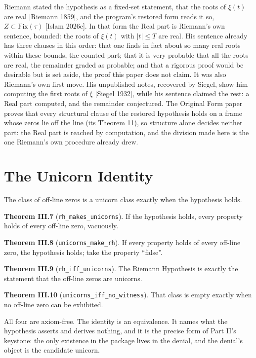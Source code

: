 \documentclass[10pt]{article}
\begin{document}
Riemann stated the hypothesis as a fixed-set statement, that the roots
of \(\xi(t)\) are real {[}Riemann 1859{]}, and the program's restored
form reads it so, \(Z \subset \mathrm{Fix}(\tau)\) {[}Islam 2026e{]}. In
that form the Real part is Riemann's own sentence, bounded: the roots of
\(\xi(t)\) with \(|t| \leq T\) are real. His sentence already has three
clauses in this order: that one finds in fact about so many real roots
within these bounds, the counted part; that it is very probable that all
the roots are real, the remainder graded as probable; and that a
rigorous proof would be desirable but is set aside, the proof this paper
does not claim. It was also Riemann's own first move. His unpublished
notes, recovered by Siegel, show him computing the first roots of
\(\xi\) {[}Siegel 1932{]}, while his sentence claimed the rest: a Real
part computed, and the remainder conjectured. The Original Form paper
proves that every structural clause of the restored hypothesis holds on
a frame whose zeros lie off the line (its Theorem 11), so structure
alone decides neither part: the Real part is reached by computation, and
the division made here is the one Riemann's own procedure already drew.

\hypertarget{the-unicorn-identity}{%
\section{The Unicorn Identity}\label{the-unicorn-identity}}

The class of off-line zeros is a unicorn class exactly when the
hypothesis holds.

\textbf{Theorem III.7} (\texttt{rh\_makes\_unicorns}). If the hypothesis
holds, every property holds of every off-line zero, vacuously.

\textbf{Theorem III.8} (\texttt{unicorns\_make\_rh}). If every property
holds of every off-line zero, the hypothesis holds; take the property
``false''.

\textbf{Theorem III.9} (\texttt{rh\_iff\_unicorns}). The Riemann
Hypothesis is exactly the statement that the off-line zeros are
unicorns.

\textbf{Theorem III.10} (\texttt{unicorns\_iff\_no\_witness}). That
class is empty exactly when no off-line zero can be exhibited.

All four are axiom-free. The identity is an equivalence. It names what
the hypothesis asserts and derives nothing, and it is the precise form
of Part II's keystone: the only existence in the package lives in the
denial, and the denial's object is the candidate unicorn.
\end{document}
